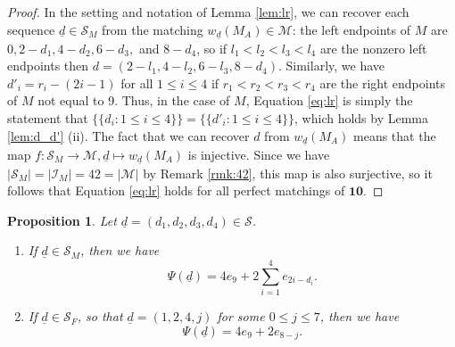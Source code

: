 \documentclass[11pt]{amsart}
\theoremstyle{plain}
\newtheorem{prop}[theorem]{Proposition}
\theoremstyle{definition}
\theoremstyle{remark}
\numberwithin{equation}{section}
\newcommand{\ra}{\rightarrow}
\newcommand{\mset}[1]{\{\!\{#1\}\!\}}
\newcommand{\seqd}{\underline{d}}
\newcommand{\cali}{\mathcal{I}}
\newcommand{\calm}{\mathcal{M}}
\newcommand{\cals}{\mathcal{S}}
\newcommand{\ten}{\mathbf{10}}
\newcommand{\abs}[1]{\lvert #1 \rvert}
\begin{document}
\begin{proof}
In the setting and notation of Lemma \ref{lem:lr}, we can recover each sequence
$\seqd\in \cals_M$ from the matching $w_{\seqd}(M_A)\in \calm$: the left endpoints of
$M$ are $0, 2-d_1, 4-d_2, 6-d_3,$ and $8-d_4$, so if $l_1<l_2<l_3<l_4$ are the
nonzero left endpoints then $d=(2-l_1, 4-l_2, 6-l_3, 8-d_4)$. Similarly, we have
$d'_i=r_i-(2i-1)$ for all $1\le i\le 4$ if $r_1<r_2<r_3<r_4$ are the right
endpoints of $M$ not equal to 9. Thus, in the case of $M$, Equation
\eqref{eq:lr} is simply the statement that $\mset{d_i: 1\le i\le
4}=\mset{d'_i:1\le i\le 4}$, which holds by Lemma \ref{lem:d_d'} (ii). The
fact that we can recover $d$ from $w_{\seqd}(M_A)$ means that the map
$f:\cals_M\ra\calm, \seqd\mapsto w_{\seqd}(M_A)$ is injective. Since we have
$\abs{\cals_M}=\abs{\cali_M}=42=\abs{\calm}$ by Remark \ref{rmk:42}, this map is
also surjective, so it follows that Equation \eqref{eq:lr} holds for all perfect
matchings of $\ten$. 
\end{proof}

\begin{prop}
\label{prop:seq_to_sum}
Let $\seqd=(d_1,d_2,d_3,d_4)\in \cals$.
\begin{enumerate}
\item If $\seqd\in \cals_M$, then we have
\[
  \Psi(\seqd)=4e_9+2\sum_{i=1}^4 e_{2i-d_i}.
\]
\item If $\seqd\in \cals_F$, so that $\seqd=(1,2,4,j)$ for some $0\le j\le 7$, then we have 
\[
  \Psi(\seqd)=4e_9+2e_{8-j}.
\]
\end{enumerate} 
\end{prop}
\end{document}
